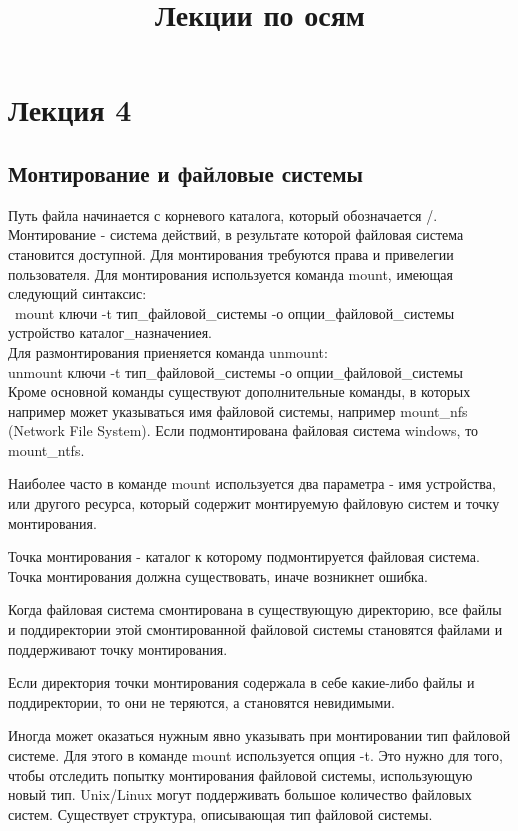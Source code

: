 \title{Лекции по осям}
\chapter{Лекция 4}
\section{Монтирование и файловые системы}
Путь файла начинается с корневого каталога, который обозначается /. Монтирование - система действий, в результате которой файловая система становится доступной. Для монтирования требуются права и привелегии пользователя. Для монтирования используется команда mount, имеющая следующий синтаксис:\\\
mount ключи -t тип\_файловой\_системы -о опции\_файловой\_системы устройство каталог\_назначениея.\\

Для размонтирования приеняется команда unmount:\\
unmount ключи -t тип\_файловой\_системы -о опции\_файловой\_системы\\

Кроме основной команды существуют дополнительные команды, в которых например может указываться имя файловой системы, например mount\_nfs (Network File System). Если подмонтирована файловая система windows, то mount\_ntfs.

Наиболее часто в команде mount используется два параметра - имя устройства, или другого ресурса, который содержит монтируемую файловую систем и точку монтирования. 

Точка монтирования - каталог к которому подмонтируется файловая система. Точка монтирования должна существовать, иначе возникнет ошибка. 

Когда файловая система смонтирована в существующую директорию, все файлы и поддиректории этой смонтированной файловой системы становятся файлами и поддерживают точку монтирования. 

Если директория точки монтирования содержала в себе какие-либо файлы и поддиректории, то они не теряются, а становятся невидимыми. 

Иногда может оказаться нужным явно указывать при монтировании тип файловой системе. Для этого в команде mount используется опция -t. Это нужно для того, чтобы отследить попытку монтирования файловой системы, использующую новый тип. Unix/Linux могут поддерживать большое количество файловых систем. Существует структура, описывающая тип файловой системы. 

